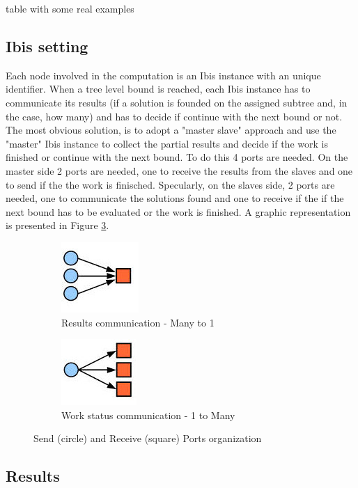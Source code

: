 \documentclass[a4paper]{article}
\begin{document}
table with some real examples

\subsection{Ibis setting}
\label{sec:ibis_setting}
Each node involved in the computation is an Ibis instance with an unique identifier.
When a tree level bound is reached, each Ibis instance has to communicate its results (if a solution is founded on the assigned subtree and, in the case, how many) and has to decide if continue with the next bound or not. The most obvious solution, is to adopt a "master slave" approach and use the "master" Ibis instance to collect the partial results and decide if the work is finished or continue with the next bound. To do this 4 ports are needed. On the master side 2 ports are needed, one to receive the results from the slaves and one to send if the  the work is finisched. Specularly, on the slaves side, 2 ports are needed, one to communicate the solutions found and one to receive if the if the next bound has to be evaluated or the work is finished. A graphic representation is presented in Figure \ref{fig:ports}.

\begin{figure}
\begin{subfigure}{0.5\textwidth}
\centering
\includegraphics[width=0.5\linewidth]{results}
\caption{Results communication - Many to 1} \label{fig:ca}
\end{subfigure}
\hspace*{\fill} %
\begin{subfigure}{0.5\textwidth}
\centering
\includegraphics[width=0.5\linewidth]{continue}
\caption{Work status communication - 1 to Many} \label{fig:cb}
\end{subfigure}
\caption{Send (circle) and Receive (square) Ports organization} \label{fig:ports}
\end{figure}
\FloatBarrier

\subsection{Results}
\label{sec:results}


\printbibliography 
\end{document}
